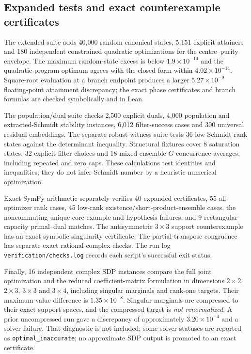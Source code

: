 \subsection{Expanded tests and exact counterexample certificates}
The extended suite adds 40,000 random canonical states, 5,151 explicit
attainers and 180 independent constrained quadratic optimizations for the
centre--purity envelope. The maximum random-state excess is below
$1.9\times10^{-14}$ and the quadratic-program optimum agrees with the
closed form within $4.02\times10^{-14}$. Square-root evaluation at a
branch endpoint produces a larger $5.27\times10^{-9}$ floating-point
attainment discrepancy; the exact phase certificates and branch formulas
are checked symbolically and in Lean.

The population/dual suite checks 2,500 explicit duals, 4,000 population and
extracted-Schmidt stability instances, 6,012 filter-success cases and 300
universal residual embeddings. The separate robust-witness suite tests
36 low-Schmidt-rank states against the determinant inequality. Structural
fixtures cover 8 saturation states, 32 explicit filter choices and 18
mixed-ensemble $G$-concurrence averages, including repeated and zero caps.
These calculations test identities and inequalities; they do not infer
Schmidt number by a heuristic numerical optimization.

Exact SymPy arithmetic separately verifies 40 expanded certificates,
55 all-optimizer rank cases, 45 low-rank existence/short-product-ensemble
cases, the noncommuting unique-core example and hypothesis failures,
and 9 rectangular capacity primal--dual matches. The antisymmetric
$3\times3$ support counterexample has an exact symbolic singularity
certificate. The partial-transpose congruence has separate exact
rational-complex checks. The run log \texttt{verification/checks.log} records each script's successful exit status.

Finally, 16 independent complex SDP instances compare the full joint
optimization and the reduced coefficient-matrix formulation in dimensions
$2\times2$, $2\times3$, $3\times3$ and $3\times4$, including singular
marginals and rank-one targets. Their maximum value difference is
$1.35\times10^{-8}$. Singular marginals are compressed to their exact
support spaces, and the compressed target is \emph{not renormalized}.
A prior uncompressed run gave a discrepancy of approximately
$3.20\times10^{-4}$ and a solver failure. That diagnostic is not included; some solver statuses are reported as \texttt{optimal\_inaccurate}; no
approximate SDP output is promoted to an exact certificate.


